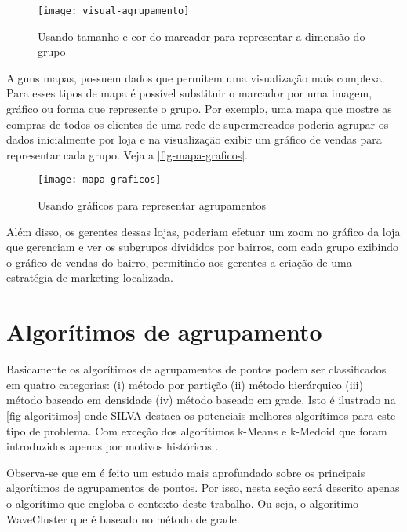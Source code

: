 		
\begin{figure}[htb]
	\caption{\label{fig-visual-agrupamento}Usando tamanho e cor do marcador para representar a dimensão do grupo}
	\begin{center}
	    \texttt{[image: visual-agrupamento]}
	\end{center}
\end{figure}

	Alguns mapas, possuem dados que permitem uma visualização mais complexa. Para esses tipos de mapa é possível substituir o marcador por uma imagem, gráfico ou forma que represente o grupo.  Por exemplo, uma mapa que mostre as compras de todos os clientes de uma rede de supermercados poderia agrupar os dados inicialmente por loja e na visualização exibir um gráfico de vendas para representar cada grupo. Veja a \autoref{fig-mapa-graficos}.
	
\begin{figure}[htb]
	\caption{\label{fig-mapa-graficos}Usando gráficos para representar agrupamentos}
	\begin{center}
	    \texttt{[image: mapa-graficos]}
	\end{center}
\end{figure}

	Além disso, os gerentes dessas lojas,  poderiam efetuar um zoom no gráfico da loja que gerenciam e ver os subgrupos divididos por bairros, com cada grupo exibindo o gráfico de vendas do bairro, permitindo aos gerentes a criação de uma estratégia de marketing localizada.
	
\section{Algorítimos de agrupamento}	
	Basicamente os algorítimos de agrupamentos de pontos podem ser classificados em quatro categorias: (i) método por partição (ii) método hierárquico (iii) método baseado em densidade (iv) método baseado em grade. Isto é ilustrado na \autoref{fig-algoritimos} onde SILVA destaca os potenciais melhores algorítimos para este tipo de problema. Com exceção dos algorítimos k-Means e k-Medoid que foram introduzidos apenas por motivos históricos \cite[35]{silva2010solap+}.
	
	Observa-se que em \cite[capítulo 2]{silva2010solap+} é feito um estudo mais aprofundado sobre os principais algorítimos de agrupamentos de pontos. Por isso, nesta seção será descrito apenas o algorítimo que engloba o contexto deste trabalho. Ou seja, o algorítimo WaveCluster que é baseado no método de grade. 
		
